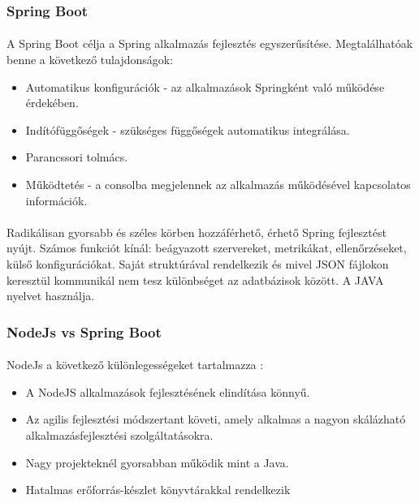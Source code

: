 \documentclass{article}
\begin{document}
	
	\subsubsection{Spring Boot}
	\paragraph{}
	A Spring Boot célja a Spring alkalmazás fejlesztés egyszerűsítése. Megtalálhatóak benne a következő tulajdonságok:
	\begin{itemize}
		\item Automatikus konfigurációk - az alkalmazások Springként való működése érdekében.
		\item Indítófüggőségek - szükséges függőségek automatikus integrálása.
		\item Parancssori tolmács.
		\item Működtetés - a consolba megjelennek az alkalmazás működésével kapcsolatos információk.
	\end{itemize}
	
	\paragraph{}
	Radikálisan gyorsabb és széles körben hozzáférhető, érhető Spring fejlesztést nyújt. Számos funkciót kínál: beágyazott szervereket, metrikákat, ellenőrzéseket, külső konfigurációkat. Saját struktúrával rendelkezik és mivel JSON fájlokon keresztül kommunikál nem tesz különbséget az adatbázisok között. A JAVA nyelvet használja.\cite{jovanovic2017java}
	
	\subsubsection{NodeJs vs Spring Boot}
	\paragraph{}
	NodeJs a következő különlegességeket tartalmazza \cite{nodejsspring}:
	\begin{itemize}
		\item A NodeJS alkalmazások fejlesztésének elindítása könnyű.
		\item Az agilis fejlesztési módszertant követi, amely alkalmas a nagyon skálázható alkalmazásfejlesztési szolgáltatásokra.
		\item Nagy projekteknél gyorsabban működik mint a Java.
		\item Hatalmas erőforrás-készlet könyvtárakkal rendelkezik
	\end{itemize}
	
\end{document}
